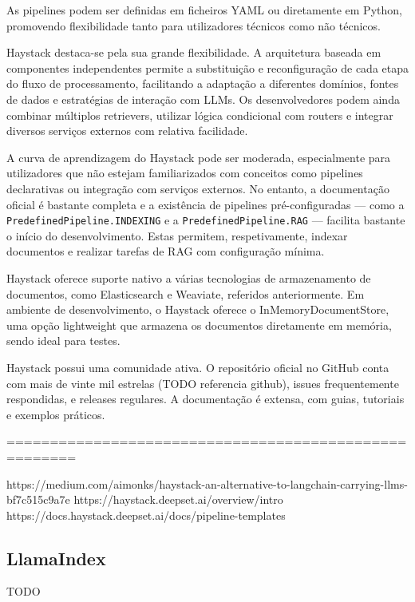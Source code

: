 As pipelines podem ser definidas em ficheiros YAML ou diretamente em Python, promovendo flexibilidade tanto para utilizadores técnicos como não técnicos.


Haystack destaca-se pela sua grande flexibilidade. A arquitetura baseada em componentes independentes permite a substituição e reconfiguração de cada etapa do fluxo de processamento, facilitando a adaptação a diferentes domínios, fontes de dados e estratégias de interação com LLMs. Os desenvolvedores podem ainda combinar múltiplos retrievers, utilizar lógica condicional com routers e integrar diversos serviços externos com relativa facilidade.



A curva de aprendizagem do Haystack pode ser moderada, especialmente para utilizadores que não estejam familiarizados com conceitos como pipelines declarativas ou integração com serviços externos. No entanto, a documentação oficial é bastante completa e a existência de pipelines pré-configuradas — como a \texttt{PredefinedPipeline.INDEXING} e a \texttt{PredefinedPipeline.RAG} — facilita bastante o início do desenvolvimento. Estas permitem, respetivamente, indexar documentos e realizar tarefas de RAG com configuração mínima.


Haystack oferece suporte nativo a várias tecnologias de armazenamento de documentos, como Elasticsearch e Weaviate, referidos anteriormente. Em ambiente de desenvolvimento, o Haystack oferece o InMemoryDocumentStore, uma opção lightweight que armazena os documentos diretamente em memória, sendo ideal para testes.


Haystack possui uma comunidade ativa. O repositório oficial no GitHub conta com mais de vinte mil estrelas (TODO referencia github), issues frequentemente respondidas, e releases regulares. A documentação é extensa, com guias, tutoriais e exemplos práticos.


======================================================

https://medium.com/aimonks/haystack-an-alternative-to-langchain-carrying-llms-bf7c515c9a7e
https://haystack.deepset.ai/overview/intro
https://docs.haystack.deepset.ai/docs/pipeline-templates



\subsection{LlamaIndex}

TODO



